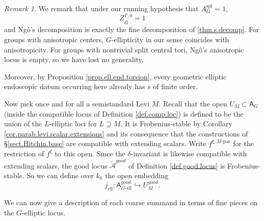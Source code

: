 \documentclass[openany]{amsbook}
\theoremstyle{definition}
\theoremstyle{remark}
\newtheorem{remark}[theorem]{Remark}
\numberwithin{equation}{section}
\newcommand{\cA}{\mathcal{A}}
\renewcommand{\-}{\operatorname{-}}
\newcommand{\on}[1]{\operatorname{#1}}
\newcommand{\good}{\mathit{good}}
\newcommand{\el}{\text{-ell}}
\newcommand{\ctA}{\widetilde{\cA}}
\newcommand{\bA}{\mathsf{A}}
\newcommand{\bAe}[1]{\bA_{#1\el}}
\newcommand{\spl}{\mathrm{spl}}
\newcommand{\Mpar}{M\text{-par}}
\begin{document}
\begin{remark}
    We remark that under our running hypothesis that $A_G^{\spl} = 1$, $$Z_{\widehat{G}}^{\Gamma, 0} = 1$$ and Ng\^{o}'s decomposition is exactly the fine decomposition of \ref{thm.s.decomp}. For groups with anisotropic centers, $G$-ellipticity in our sense coincides with anisotropicity. For groups with nontrivial split central tori, Ng\^{o}'s anisotropic locus is empty, so we have lost no generality.

    Moreover, by Proposition \ref{prop.ell.end.torsion}, every geometric elliptic endoscopic datum occurring here already has $s$ of finite order. 
\end{remark}


Now pick once and for all a semistandard Levi $M$. Recall that the open $U_M \subset \bA_G$ (inside the compatible locus of Definition \ref{def.comp.loc}) is defined to be the union of the $L$-elliptic loci for $L \supseteq M$. It is Frobenius-stable by Corollary \ref{cor.parab.levi.scalar.extensions} and its consequence that the constructions of \S \ref{sect.Hitchin.base} are compatible with extending scalars. Write $f^{\xi, \Mpar}$ for the restriction of $f^{\xi}$ to this open. Since the $\delta$-invariant is likewise compatible with extending scalars, the good locus $\ctA^{\good}$ of Definition \ref{def.good.locus} is Frobenius-stable. So we can define over $k_0$ the open embedding
$$
    j_{\on{ell}} : \bAe{G}^{\good} \hookrightarrow U_M^{\good}.
$$






We can now give a description of each coarse summand in terms of fine pieces on the $G$-elliptic locus.
\end{document}
